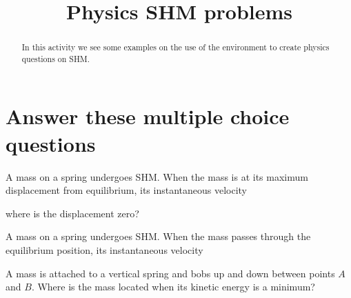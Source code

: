 \documentclass{ximera}
\title{Physics SHM problems }
\begin{document}
\begin{abstract}
In this activity we see some examples on the use of the environment to create physics questions on SHM.
\end{abstract}
\maketitle

\section{Answer these multiple choice questions}

\begin{question}
A mass on a spring undergoes SHM. When the mass is at its maximum displacement from equilibrium, its instantaneous velocity
\begin{solution}
\begin{multiple-choice}
\end{multiple-choice}
\begin{hint}
where is the displacement zero?
\end{hint}
\end{solution}
\end{question}

\begin{question}
A mass on a spring undergoes SHM. When the mass passes through the equilibrium position, its instantaneous velocity
\begin{solution}
\begin{multiple-choice}
\end{multiple-choice}
\end{solution}
\end{question}

\begin{question}
A mass is attached to a vertical spring and bobs up and down between points $A$ and $B$. Where is the mass located when its kinetic
energy is a minimum?
\begin{solution}
\begin{multiple-choice}
\end{multiple-choice}
\end{solution}
\end{question}
\end{document}
